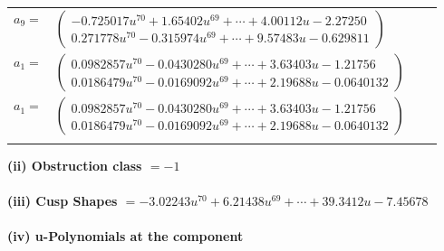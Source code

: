\documentclass[1p]{elsarticle_modified}
\theoremstyle{definition}
\begin{document}
\begin{tabular}{m{7pt} m{180pt} m{7pt} m{180pt} }
\flushright $a_{9}=$&$\begin{pmatrix}-0.725017 u^{70}+1.65402 u^{69}+\cdots+4.00112 u-2.27250\\0.271778 u^{70}-0.315974 u^{69}+\cdots+9.57483 u-0.629811\end{pmatrix}$ \\
\flushright $a_{1}=$&$\begin{pmatrix}0.0982857 u^{70}-0.0430280 u^{69}+\cdots+3.63403 u-1.21756\\0.0186479 u^{70}-0.0169092 u^{69}+\cdots+2.19688 u-0.0640132\end{pmatrix}$\\ \flushright $a_{1}=$&$\begin{pmatrix}0.0982857 u^{70}-0.0430280 u^{69}+\cdots+3.63403 u-1.21756\\0.0186479 u^{70}-0.0169092 u^{69}+\cdots+2.19688 u-0.0640132\end{pmatrix}$\\&\end{tabular}
\flushleft \textbf{(ii) Obstruction class $= -1$}\\~\\
\flushleft \textbf{(iii) Cusp Shapes $= -3.02243 u^{70}+6.21438 u^{69}+\cdots+39.3412 u-7.45678$}\\~\\
\newpage\renewcommand{\arraystretch}{1}
\flushleft \textbf{(iv) u-Polynomials at the component}\newline \\
\end{document}

